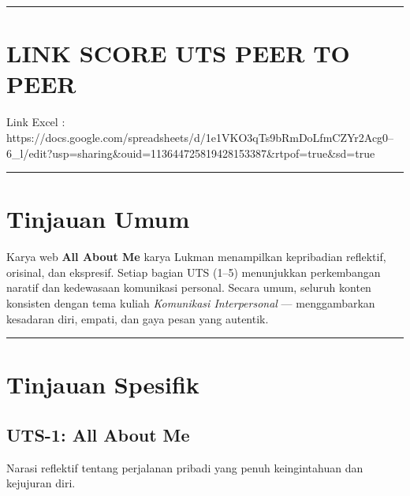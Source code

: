 \documentclass[
  letterpaper,
  DIV=11,
  numbers=noendperiod]{scrreprt}
\begin{document}
\begin{center}\rule{0.5\linewidth}{0.5pt}\end{center}

\section{LINK SCORE UTS PEER TO PEER}\label{link-score-uts-peer-to-peer}

Link Excel :
https://docs.google.com/spreadsheets/d/1e1VKO3qTs9bRmDoLfmCZYr2Acg0--6\_l/edit?usp=sharing\&ouid=113644725819428153387\&rtpof=true\&sd=true

\begin{center}\rule{0.5\linewidth}{0.5pt}\end{center}

\section{Tinjauan Umum}\label{tinjauan-umum}

Karya web \textbf{All About Me} karya Lukman menampilkan kepribadian
reflektif, orisinal, dan ekspresif. Setiap bagian UTS (1--5) menunjukkan
perkembangan naratif dan kedewasaan komunikasi personal. Secara umum,
seluruh konten konsisten dengan tema kuliah \emph{Komunikasi
Interpersonal} --- menggambarkan kesadaran diri, empati, dan gaya pesan
yang autentik.

\begin{center}\rule{0.5\linewidth}{0.5pt}\end{center}

\section{Tinjauan Spesifik}\label{tinjauan-spesifik}

\subsection{UTS-1: All About Me}\label{uts-1-all-about-me}

Narasi reflektif tentang perjalanan pribadi yang penuh keingintahuan dan
kejujuran diri.
\end{document}
